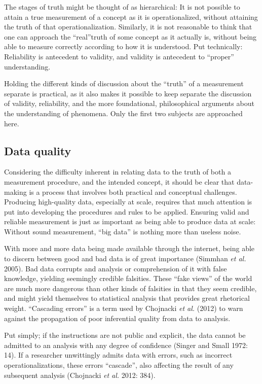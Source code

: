 \documentclass[12pt,twoside]{reedthesis}
\begin{document}
The stages of truth might be thought of as hierarchical: It is not
possible to attain a true measurement of a concept as it is
operationalized, without attaining the truth of that operationalization.
Similarly, it is not reasonable to think that one can approach the
``real''truth of some concept as it actually is, without being able to
measure correctly according to how it is understood. Put technically:
Reliability is antecedent to validity, and validity is antecedent to
``proper'' understanding.

Holding the different kinds of discussion about the ``truth'' of a
measurement separate is practical, as it also makes it possible to keep
separate the discussion of validity, reliability, and the more
foundational, philosophical arguments about the understanding of
phenomena. Only the first two subjects are approached here.

\subsection{Data quality}\label{data-quality}

Considering the difficulty inherent in relating data to the truth of
both a measurement procedure, and the intended concept, it should be
clear that data-making is a process that involves both practical and
conceptual challenges. Producing high-quality data, especially at scale,
requires that much attention is put into developing the procedures and
rules to be applied. Ensuring valid and reliable measurement is just as
important as being able to produce data at scale: Without sound
measurement, ``big data'' is nothing more than useless noise.

With more and more data being made available through the internet, being
able to discern between good and bad data is of great importance
(Simmhan \emph{et al.} 2005). Bad data corrupts and analysis or
comprehension of it with false knowledge, yielding seemingly credible
falsities. These ``fake views'' of the world are much more dangerous
than other kinds of falsities in that they seem credible, and might
yield themselves to statistical analysis that provides great rhetorical
weight. ``Cascading errors'' is a term used by Chojnacki \emph{et al.}
(2012) to warn against the propagation of poor inferential quality from
data to analysis.

Put simply; if the instructions are not public and explicit, the data
cannot be admitted to an analysis with any degree of confidence (Singer
and Small 1972: 14). If a researcher unwittingly admits data with
errors, such as incorrect operationalizations, these errors ``cascade'',
also affecting the result of any subsequent analysis (Chojnacki \emph{et
al.} 2012: 384).
\end{document}
